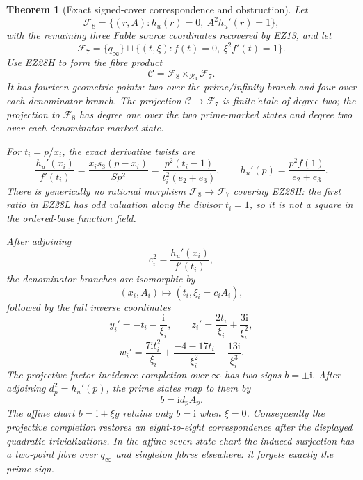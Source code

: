\documentclass[11pt]{article}
\newtheorem{theorem}{Theorem}[section]
\theoremstyle{definition}\newtheorem{definition}[theorem]{Definition}
\theoremstyle{remark}\newtheorem{remark}[theorem]{Remark}
\newcommand{\ii}{\mathrm i}
\begin{document}
\begin{theorem}[Exact signed-cover correspondence and obstruction]
\label{thm:signed-reciprocal-correspondence}
Let
\[
 \mathcal F_8=\{(r,A):h_u(r)=0,\ A^2h_u'(r)=1\},
\]
with the remaining three Fable source coordinates recovered by EZ13, and let
\[
 \mathcal F_7=\{q_\infty\}\sqcup
 \{(t,\xi):f(t)=0,\ \xi^2f'(t)=1\}.
\]
Use EZ28H to form the fibre product
\begin{equation}
 \mathcal C=\mathcal F_8
 \mathop{\times}_{\mathcal R_4}\mathcal F_7.           \tag{EZ28K}
\end{equation}
It has fourteen geometric points: two over the prime/infinity branch and four
over each denominator branch.  The projection
\(\mathcal C\to\mathcal F_7\) is finite \(\acute{e}\)tale of degree two; the
projection to \(\mathcal F_8\) has degree one over the two prime-marked states
and degree two over each denominator-marked state.

For \(t_i=p/x_i\), the exact derivative twists are
\begin{equation}
 \frac{h_u'(x_i)}{f'(t_i)}
 =\frac{x_is_3(p-x_i)}{Sp^2}
 =\frac{p^2(t_i-1)}{t_i^2(e_2+e_3)},\qquad
 h_u'(p)=\frac{p^2f(1)}{e_2+e_3}.                      \tag{EZ28L}
\end{equation}
There is generically no rational morphism
\(\mathcal F_8\to\mathcal F_7\) covering EZ28H: the first ratio in EZ28L has
odd valuation along the divisor \(t_i=1\), so it is not a square in the
ordered-base function field.

After adjoining
\begin{equation}
 c_i^2=\frac{h_u'(x_i)}{f'(t_i)},                       \tag{EZ28M}
\end{equation}
the denominator branches are isomorphic by
\[
 (x_i,A_i)\longmapsto(t_i,\xi_i=c_iA_i),
\]
followed by the full inverse coordinates
\[
 y_i'=-t_i-\frac{\ii}{\xi_i},\qquad
 z_i'=\frac{2t_i}{\xi_i}+\frac{3\ii}{\xi_i^2},
\]
\[
 w_i'=\frac{7\ii t_i^2}{\xi_i}
 +\frac{-4-17t_i}{\xi_i^2}-\frac{13\ii}{\xi_i^3}.
\]
The projective factor-incidence completion over \(\infty\) has two signs
\(b=\pm\ii\).  After adjoining \(d_p^2=h_u'(p)\), the prime states map to
them by
\begin{equation}
 b=\ii d_pA_p.                                         \tag{EZ28N}
\end{equation}
The affine chart \(b=\ii+\xi y\) retains only \(b=\ii\) when \(\xi=0\).
Consequently the projective completion restores an eight-to-eight
correspondence after the displayed quadratic trivializations.  In the affine
seven-state chart the induced surjection has a two-point fibre over
\(q_\infty\) and singleton fibres elsewhere: it forgets exactly the prime
sign.
\end{theorem}
\end{document}
